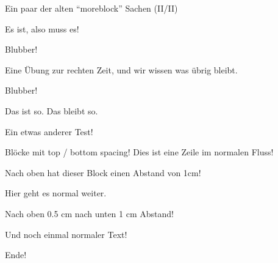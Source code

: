 \documentclass[
  ignorenonframetext,
]{beamer}
\begin{document}
\begin{frame}{Ein paar der alten ``moreblock'' Sachen (II/II)}
\protect\hypertarget{ein-paar-der-alten-moreblock-sachen-iiii-1}{}
\begin{definition}

Es ist, also muss es!

Blubber!

\end{definition}

\begin{Uebung}

Eine Übung zur rechten Zeit, und wir wissen was übrig bleibt.

Blubber!

\end{Uebung}

\begin{Fakt}

Das ist so. Das bleibt so.

\end{Fakt}

\begin{Beispiel}[\(<\) \(>\) \(\leq\)]

Ein etwas anderer Test!

\end{Beispiel}
\end{frame}

\begin{frame}{Blöcke mit top / bottom spacing!}
\protect\hypertarget{bluxf6cke-mit-top-bottom-spacing}{}
Dies ist eine Zeile im normalen Fluss!

\vspace*{1cm}

Nach oben hat dieser Block einen Abstand von 1cm!

Hier geht es normal weiter.

\vspace*{0.5cm}

Nach oben 0.5 cm nach unten 1 cm Abstand!

\vspace*{1cm}

Und noch einmal normaler Text!
\end{frame}

\begin{frame}{Ende!}
\protect\hypertarget{ende}{}
\end{frame}
\end{document}
